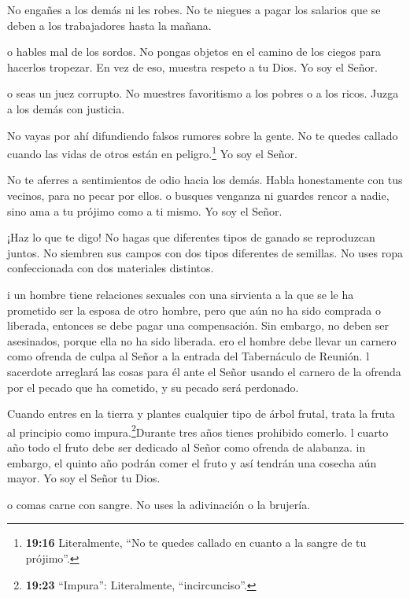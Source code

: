  No engañes a los demás ni les robes. No te niegues a pagar
los salarios que se deben a los trabajadores hasta la mañana.

 o hables mal de los sordos. No pongas objetos en el camino
de los ciegos para hacerlos tropezar. En vez de eso, muestra respeto a
tu Dios. Yo soy el Señor.

 o seas un juez corrupto. No muestres favoritismo a los
pobres o a los ricos. Juzga a los demás con justicia.

 No vayas por ahí difundiendo falsos rumores sobre la
gente. No te quedes callado cuando las vidas de otros están en
peligro.\footnote{\textbf{19:16} Literalmente, ``No te quedes callado en
  cuanto a la sangre de tu prójimo''.} Yo soy el Señor.

 No te aferres a sentimientos de odio hacia los demás.
Habla honestamente con tus vecinos, para no pecar por ellos.
 o busques venganza ni guardes rencor a nadie, sino ama a
tu prójimo como a ti mismo. Yo soy el Señor.

 ¡Haz lo que te digo! No hagas que diferentes tipos de
ganado se reproduzcan juntos. No siembren sus campos con dos tipos
diferentes de semillas. No uses ropa confeccionada con dos materiales
distintos.

 i un hombre tiene relaciones sexuales con una sirvienta a
la que se le ha prometido ser la esposa de otro hombre, pero que aún no
ha sido comprada o liberada, entonces se debe pagar una compensación.
Sin embargo, no deben ser asesinados, porque ella no ha sido liberada.
 ero el hombre debe llevar un carnero como ofrenda de culpa
al Señor a la entrada del Tabernáculo de Reunión.  l
sacerdote arreglará las cosas para él ante el Señor usando el carnero de
la ofrenda por el pecado que ha cometido, y su pecado será perdonado.

 Cuando entres en la tierra y plantes cualquier tipo de
árbol frutal, trata la fruta al principio como impura.\footnote{\textbf{19:23}
  ``Impura'': Literalmente, ``incircunciso''.}Durante tres años tienes
prohibido comerlo.  l cuarto año todo el fruto debe ser
dedicado al Señor como ofrenda de alabanza.  in embargo, el
quinto año podrán comer el fruto y así tendrán una cosecha aún mayor. Yo
soy el Señor tu Dios.

 o comas carne con sangre. No uses la adivinación o la
brujería.

